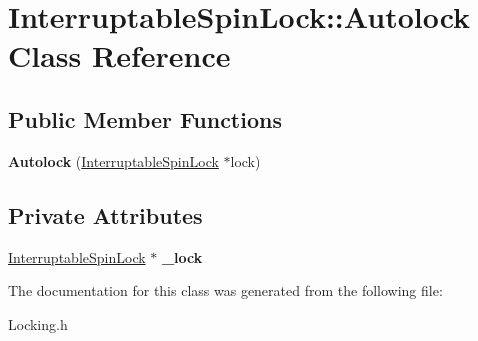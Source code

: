 \hypertarget{class_interruptable_spin_lock_1_1_autolock}{}\section{Interruptable\+Spin\+Lock\+:\+:Autolock Class Reference}
\label{class_interruptable_spin_lock_1_1_autolock}
\subsection*{Public Member Functions}
\begin{DoxyCompactItemize}
\item 
\mbox{\label{class_interruptable_spin_lock_1_1_autolock_a468c166688de715f62f7075759c2dbf5}} 
{\bfseries Autolock} (\hyperlink{class_interruptable_spin_lock}{Interruptable\+Spin\+Lock} $\ast$lock)
\end{DoxyCompactItemize}
\subsection*{Private Attributes}
\begin{DoxyCompactItemize}
\item 
\mbox{\label{class_interruptable_spin_lock_1_1_autolock_a11a887823f81d878af0e1c31cf765ed4}} 
\hyperlink{class_interruptable_spin_lock}{Interruptable\+Spin\+Lock} $\ast$ {\bfseries \+\_\+lock}
\end{DoxyCompactItemize}


The documentation for this class was generated from the following file\+:\begin{DoxyCompactItemize}
\item 
Locking.\+h\end{DoxyCompactItemize}
